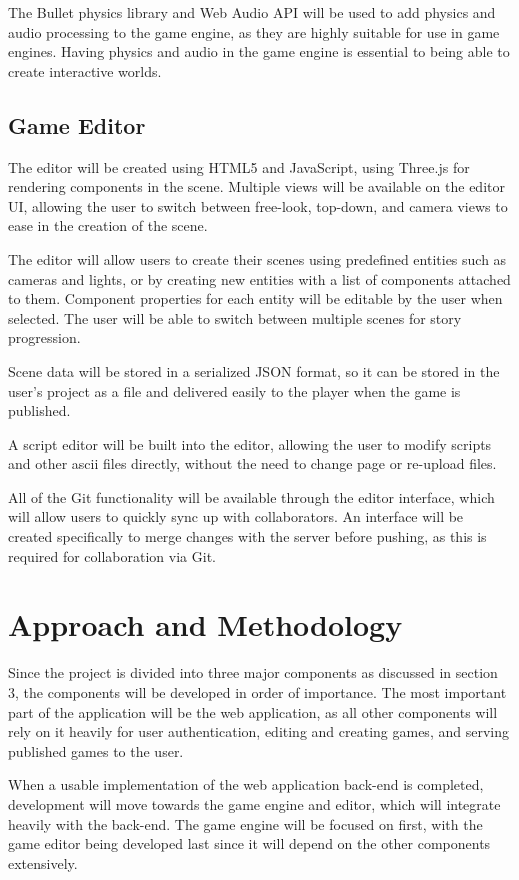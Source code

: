 \documentclass[a4paper, 12pt]{article}
\begin{document}
The Bullet physics library and Web Audio API will be used to add physics and audio processing to the game engine, as they are highly suitable for use in game engines. Having physics and audio in the game engine is essential to being able to create interactive worlds.

\subsection{Game Editor}
The editor will be created using HTML5 and JavaScript, using Three.js for rendering components in the scene. Multiple views will be available on the editor UI, allowing the user to switch between free-look, top-down, and camera views to ease in the creation of the scene.

The editor will allow users to create their scenes using predefined entities such as cameras and lights, or by creating new entities with a list of components attached to them. Component properties for each entity will be editable by the user when selected. The user will be able to switch between multiple scenes for story progression.

Scene data will be stored in a serialized JSON format, so it can be stored in the user's project as a file and delivered easily to the player when the game is published.

A script editor will be built into the editor, allowing the user to modify scripts and other ascii files directly, without the need to change page or re-upload files.

All of the Git functionality will be available through the editor interface, which will allow users to quickly sync up with collaborators. An interface will be created specifically to merge changes with the server before pushing, as this is required for collaboration via Git.

\section{Approach and Methodology}
Since the project is divided into three major components as discussed in section 3, the components will be developed in order of importance. The most important part of the application will be the web application, as all other components will rely on it heavily for user authentication, editing and creating games, and serving published games to the user.

When a usable implementation of the web application back-end is completed, development will move towards the game engine and editor, which will integrate heavily with the back-end. The game engine will be focused on first, with the game editor being developed last since it will depend on the other components extensively.
\end{document}
